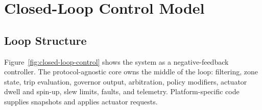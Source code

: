 \section{Closed-Loop Control Model}\label{sec:control-model}

\subsection{Loop Structure}

Figure~\ref{fig:closed-loop-control} shows the system as a negative-feedback controller. The protocol-agnostic core owns the middle of the loop: filtering, zone state, trip evaluation, governor output, arbitration, policy modifiers, actuator dwell and spin-up, slew limits, faults, and telemetry. Platform-specific code supplies snapshots and applies actuator requests.

